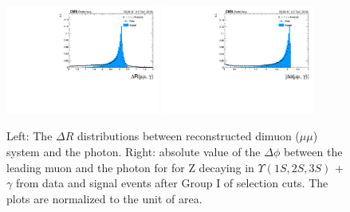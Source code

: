 \begin{figure}[!htbp]
\begin{center}
\includegraphics[width=0.45\textwidth]{figures_and_tables/outputPlots/ZtoUpsilon_Cat0_ZZZZZ/au/data_x_mc/noKinCuts/h_noKin_deltaR_Upsilon_Photon}\hspace*{1.cm}
\includegraphics[width=0.45\textwidth]{figures_and_tables/outputPlots/ZtoUpsilon_Cat0_ZZZZZ/au/data_x_mc/noKinCuts/h_noKin_deltaPhi_Upsilon_Photon}\end{center}\vspace*{-.5cm}
\caption{Left: The $\Delta R$ distributions between reconstructed dimuon ($\mu\mu$) system and the photon. Right: absolute value of the $\Delta \phi$ between the leading muon and the photon for for Z decaying in $\Upsilon(1S,2S,3S)$ + $\gamma$ from data and signal events after Group I of selection cuts. The plots are normalized to the unit of area.}
\label{fig:deltaRdeltaPhi_ZtoUpsilon_Cat0}
\end{figure}


